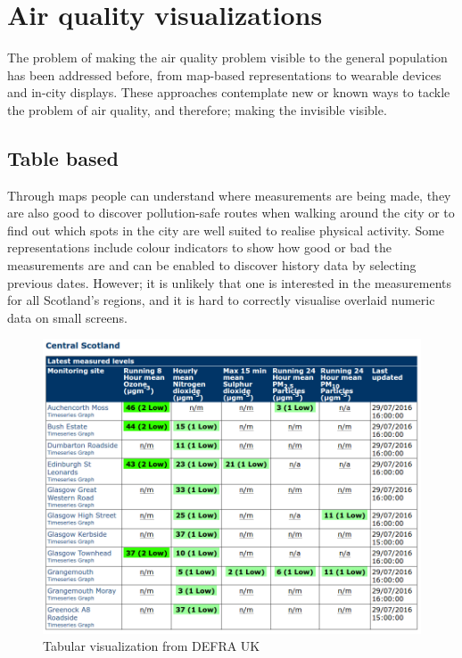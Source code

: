 \section{Air quality visualizations}
The problem of making the air quality problem visible to the general population has been addressed before, from map-based representations to wearable devices and in-city displays. These approaches contemplate new or known ways to tackle the problem of air quality, and therefore; making the invisible visible.

\subsection{Table based}
Through maps people can understand where measurements are being made, they are also good to discover pollution-safe routes when walking around the city or to find out which spots in the city are well suited to realise physical activity.  Some representations include colour indicators to show how good or bad the measurements are and can be enabled to discover history data by selecting previous dates. However; it is unlikely that one is interested in the measurements for all Scotland's regions, and it is hard to correctly visualise overlaid numeric data on small screens.

\begin{figure}[H]
\begin{adjustbox}{width=1\textwidth,center=\textwidth}
  \centering
  \includegraphics[scale=1]{images/tabular_data.png}
\end{adjustbox}
  \caption[Tabular visualization]{Tabular visualization from DEFRA UK \cite{DepartmentforEnvironment}}
  \label{fig:table_based_visualization}
\end{figure}

